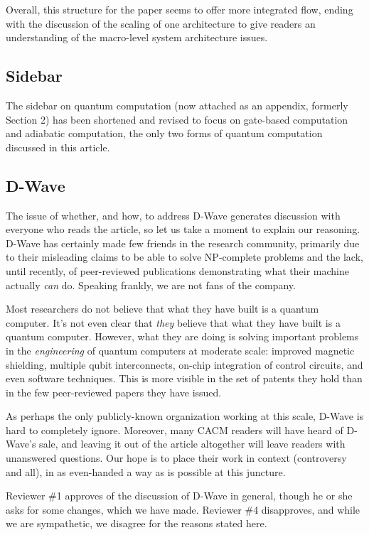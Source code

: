 \documentclass{article}
\begin{document}
Overall, this structure for the paper seems to offer more integrated
flow, ending with the discussion of the scaling of one architecture to
give readers an understanding of the macro-level system architecture
issues.

\subsection{Sidebar}

The sidebar on quantum computation (now attached as an appendix,
formerly Section 2) has been shortened and revised to focus on
gate-based computation and adiabatic computation, the only two forms
of quantum computation discussed in this article.

\subsection{D-Wave}
\label{sec:d-wave}

The issue of whether, and how, to address D-Wave generates discussion
with everyone who reads the article, so let us take a moment to
explain our reasoning.  D-Wave has certainly made few friends in the
research community, primarily due to their misleading claims to be
able to solve NP-complete problems and the lack, until recently, of
peer-reviewed publications demonstrating what their machine actually
{\em can} do.  Speaking frankly, we are not fans of the company.

Most researchers do not believe that what they have built is a quantum
computer.  It's not even clear that {\em they} believe that what they
have built is a quantum computer.  However, what they are doing is
solving important problems in the {\em engineering} of quantum
computers at moderate scale: improved magnetic shielding, multiple
qubit interconnects, on-chip integration of control circuits, and even
software techniques.  This is more visible in the set of patents they
hold than in the few peer-reviewed papers they have issued.

As perhaps the only publicly-known organization working at this scale,
D-Wave is hard to completely ignore.  Moreover, many CACM readers will
have heard of D-Wave's sale, and leaving it out of the article
altogether will leave readers with unanswered questions.  Our hope is
to place their work in context (controversy and all), in as
even-handed a way as is possible at this juncture.

Reviewer \#1 approves of the discussion of D-Wave in general, though
he or she asks for some changes, which we have made.  Reviewer \#4
disapproves, and while we are sympathetic, we disagree for the reasons
stated here.
\end{document}
